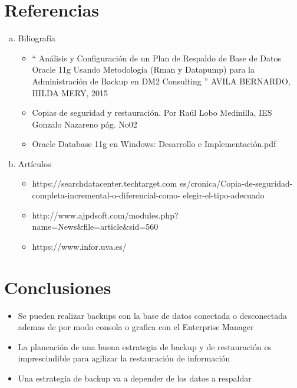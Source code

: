 \documentclass[a4paper,twocolumn,10pt]{article}
\begin{document}
\section{Referencias}
   \begin{enumerate}[a)]
        \item Biliograf\'ia
\begin{itemize}  
\normalsize \item `` An\'alisis y Configuraci\'on de un Plan de Respaldo de Base de Datos Oracle 11g Usando Metodolog\'ia
(Rman y Datapump) para la Administraci\'on de Backup en DM2 Consulting ''
AVILA BERNARDO, HILDA MERY, 2015
\item  Copias de seguridad y restauraci\'on. Por Ra\'ul Lobo Medinilla, IES Gonzalo Nazareno p\'ag. No02
\item Oracle Database 11g en Windows: Desarrollo e Implementaci\'on.pdf

\end{itemize}
\normalsize	\item Art\'iculos
\begin{itemize}  
 \item \normalsize https://searchdatacenter.techtarget.com
\normalsize es/cronica/Copia-de-seguridad-completa-incremental-o-diferencial-como-
\normalsize elegir-el-tipo-adecuado
\normalsize \item http://www.ajpdsoft.com/modules.php?
\normalsize name=News\&file=article\&sid=560
\normalsize \item https://www.infor.uva.es/
\end{itemize}
 \end{enumerate}




\section{Conclusiones}
\begin{itemize}  
\item Se pueden realizar backups con la base de datos conectada o desconectada ademas de por
modo consola o grafica con el Enterprise Manager
\item La planeaci\'on de una buena estrategia de backup y de restauraci\'on es imprescindible para
agilizar la restauraci\'on de informaci\'on
\item Una estrategia de backup va a depender de los datos a respaldar
\end{itemize}
\end{document}
